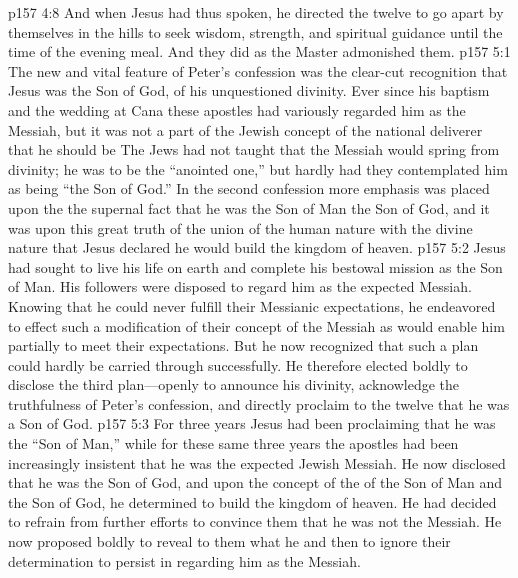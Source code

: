 \pc \vs p157 4:8 And when Jesus had thus spoken, he directed the twelve to go apart by themselves in the hills to seek wisdom, strength, and spiritual guidance until the time of the evening meal. And they did as the Master admonished them.
\vs p157 5:1 The new and vital feature of Peter’s confession was the clear\hyp{}cut recognition that Jesus was the Son of God, of his unquestioned divinity. Ever since his baptism and the wedding at Cana these apostles had variously regarded him as the Messiah, but it was not a part of the Jewish concept of the national deliverer that he should be  The Jews had not taught that the Messiah would spring from divinity; he was to be the “anointed one,” but hardly had they contemplated him as being “the Son of God.” In the second confession more emphasis was placed upon the  the supernal fact that he was the Son of Man  the Son of God, and it was upon this great truth of the union of the human nature with the divine nature that Jesus declared he would build the kingdom of heaven.
\vs p157 5:2 Jesus had sought to live his life on earth and complete his bestowal mission as the Son of Man. His followers were disposed to regard him as the expected Messiah. Knowing that he could never fulfill their Messianic expectations, he endeavored to effect such a modification of their concept of the Messiah as would enable him partially to meet their expectations. But he now recognized that such a plan could hardly be carried through successfully. He therefore elected boldly to disclose the third plan---openly to announce his divinity, acknowledge the truthfulness of Peter’s confession, and directly proclaim to the twelve that he was a Son of God.
\vs p157 5:3 For three years Jesus had been proclaiming that he was the \textcolor{ubdarkred}{“Son of Man,”} while for these same three years the apostles had been increasingly insistent that he was the expected Jewish Messiah. He now disclosed that he was the Son of God, and upon the concept of the  of the Son of Man and the Son of God, he determined to build the kingdom of heaven. He had decided to refrain from further efforts to convince them that he was not the Messiah. He now proposed boldly to reveal to them what he  and then to ignore their determination to persist in regarding him as the Messiah.
